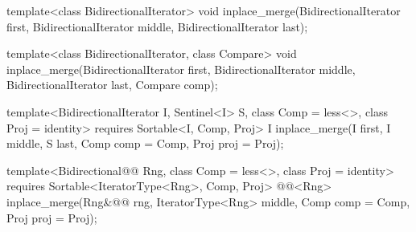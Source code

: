 %
\begin{removedblock}
\begin{itemdecl}
template<class BidirectionalIterator>
  void inplace_merge(BidirectionalIterator first,
                     BidirectionalIterator middle,
                     BidirectionalIterator last);

template<class BidirectionalIterator, class Compare>
  void inplace_merge(BidirectionalIterator first,
                     BidirectionalIterator middle,
                     BidirectionalIterator last, Compare comp);
\end{itemdecl}
\end{removedblock}
\begin{addedblock}
\begin{itemdecl}
template<BidirectionalIterator I, Sentinel<I> S, class Comp = less<>,
    class Proj = identity>
  requires Sortable<I, Comp, Proj>
  I
    inplace_merge(I first, I middle, S last, Comp comp = Comp{}, Proj proj = Proj{});

template<Bidirectional@@ Rng, class Comp = less<>, class Proj = identity>
  requires Sortable<IteratorType<Rng>, Comp, Proj>
  @@<Rng>
    inplace_merge(Rng&@\newtxt{\&}@ rng, IteratorType<Rng> middle, Comp comp = Comp{},
                  Proj proj = Proj{});
\end{itemdecl}
\end{addedblock}

